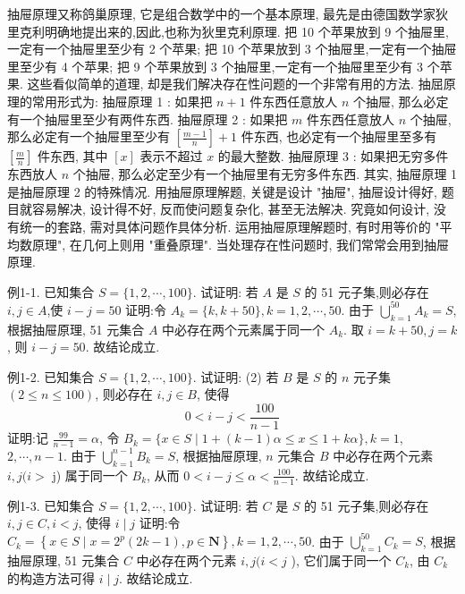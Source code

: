 
抽屉原理又称鸽巢原理, 它是组合数学中的一个基本原理, 最先是由德国数学家狄里克利明确地提出来的,因此,也称为狄里克利原理.
把 10 个苹果放到 9 个抽屉里,一定有一个抽屉里至少有 2 个苹果; 把 10 个苹果放到 3 个抽屉里,一定有一个抽屉里至少有 4 个苹果; 把 9 个苹果放到 3 个抽屉里,一定有一个抽屉里至少有 3 个苹果.
这些看似简单的道理, 却是我们解决存在性问题的一个非常有用的方法.
抽屈原理的常用形式为:
抽屉原理 1 : 如果把 $n+1$ 件东西任意放人 $n$ 个抽屉, 那么必定有一个抽屉里至少有两件东西.
抽屉原理 2 : 如果把 $m$ 件东西任意放人 $n$ 个抽屉, 那么必定有一个抽屉里至少有 $\left[\frac{m-1}{n}\right]+1$ 件东西, 也必定有一个抽屉里至多有 $\left[\frac{m}{n}\right]$ 件东西, 其中 $[x]$ 表示不超过 $x$ 的最大整数.
抽屉原理 3 : 如果把无穷多件东西放人 $n$ 个抽屉, 那么必定至少有一个抽屉里有无穷多件东西.
其实, 抽屉原理 1 是抽屉原理 2 的特殊情况.
用抽屉原理解题, 关键是设计 "抽屉", 抽屉设计得好, 题目就容易解决, 设计得不好, 反而使问题复杂化, 甚至无法解决.
究竟如何设计, 没有统一的套路, 需对具体问题作具体分析.
运用抽屉原理解题时, 有时用等价的 "平均数原理", 在几何上则用 "重叠原理".
当处理存在性问题时, 我们常常会用到抽屉原理.



例1-1. 已知集合 $S=\{1,2, \cdots, 100\}$. 试证明: 若 $A$ 是 $S$ 的 51 元子集,则必存在 $i, j \in A$,使 $i-j=50$
证明:令 $A_k=\{k, k+50\}, k=1,2, \cdots, 50$.
由于 $\bigcup_{k=1}^{50} A_k=S$, 根据抽屉原理, 51 元集合 $A$ 中必存在两个元素属于同一个 $A_k$. 取 $i=k+50, j=k$, 则 $i-j=50$. 故结论成立.



例1-2. 已知集合 $S=\{1,2, \cdots, 100\}$. 试证明:
(2) 若 $B$ 是 $S$ 的 $n$ 元子集 $(2 \leqslant n \leqslant 100)$, 则必存在 $i, j \in B$, 使得
$$
0<i-j<\frac{100}{n-1}
$$
证明:记 $\frac{99}{n-1}=\alpha$, 令 $B_k=\{x \in S \mid 1+(k-1) \alpha \leqslant x \leqslant 1+k \alpha\}, k=1$, $2, \cdots, n-1$.
由于 $\bigcup_{k=1}^{n-1} B_k=S$, 根据抽屉原理, $n$ 元集合 $B$ 中必存在两个元素 $i, j(i>$ j) 属于同一个 $B_k$, 从而 $0<i-j \leqslant \alpha<\frac{100}{n-1}$. 故结论成立.



例1-3. 已知集合 $S=\{1,2, \cdots, 100\}$. 试证明:
若 $C$ 是 $S$ 的 51 元子集,则必存在 $i, j \in C, i<j$, 使得 $i \mid j$
证明:令 $C_k=\left\{x \in S \mid x=2^p(2 k-1), p \in \mathbf{N}\right\}, k=1,2, \cdots, 50$.
由于 $\bigcup_{k=1}^{50} C_k=S$, 根据抽屉原理, 51 元集合 $C$ 中必存在两个元素 $i, j(i< j$ ), 它们属于同一个 $C_k$, 由 $C_k$ 的构造方法可得 $i \mid j$. 故结论成立.




